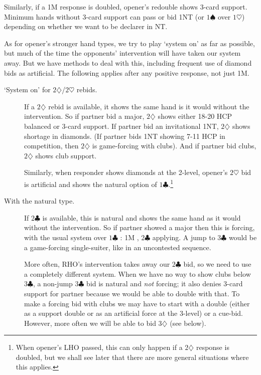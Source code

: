 \documentclass{article}
\newcommand{\sz}{\spadesuit}
\newcommand{\hz}{\heartsuit}
\newcommand{\dz}{\diamondsuit}
\newcommand{\cz}{\clubsuit}
\begin{document}
Similarly, if a 1M response is doubled, opener's redouble shows 3-card support. Minimum hands without 3-card support can pass or bid 1NT (or $1\sz$ over $1\hz$) depending on whether we want to be declarer in NT.

\vspace{4mm}
As for opener's stronger hand types, we try to play `system on' as far as possible, but much of the time the opponents' intervention will have taken our system away. But we have methods to deal with this, including frequent use of diamond bids as artificial. The following applies after any positive response, not just 1M.

\begin{description}
\item[`System on' for $2\dz$/$2\hz$ rebids.] If a $2\dz$ rebid is available, it shows the same hand is it would without the intervention. So if partner bid a major, $2\dz$ shows either 18-20 HCP balanced or 3-card support. If partner bid an invitational 1NT, $2\dz$ shows shortage in diamonds. (If partner bids 1NT showing 7-11 HCP in competition, then $2\dz$ is game-forcing with clubs). And if partner bid clubs, $2\dz$ shows club support.

Similarly, when responder shows diamonds at the 2-level, opener's $2\hz$ bid is artificial and shows the natural option of $1\cz$.\footnote{When opener's LHO passed, this can only happen if a $2\dz$ response is doubled, but we shall see later that there are more general situations where this applies.}

\item[With the natural type.] If $2\cz$ is available, this is natural and shows the same hand as it would without the intervention. So if partner showed a major then this is forcing, with the usual system over $1\cz$ : 1M , $2\cz$ applying. A jump to $3\cz$ would be a game-forcing single-suiter, like in an uncontested sequence.

More often, RHO's intervention takes away our $2\cz$ bid, so we need to use a completely different system. When we have no way to show clubs below $3\cz$, a non-jump $3\cz$ bid is natural and \emph{not} forcing; it also denies 3-card support for partner because we would be able to double with that. To make a forcing bid with clubs we may have to start with a double (either as a support double or as an artificial force at the 3-level) or a cue-bid. However, more often we will be able to bid $3\dz$ (see below).


\end{description}
\end{document}
